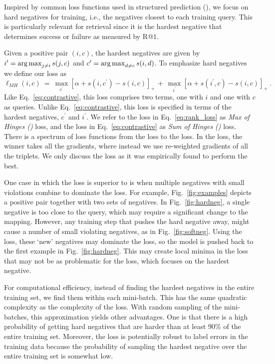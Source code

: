 Inspired by common loss functions used in structured prediction 
(\cite{tsochantaridis2005large, yu2009learning, felzenszwalb2010object}), we 
focus on hard negatives for training, i.e., the negatives closest to each 
training query.  This is particularly relevant for retrieval since it is the 
hardest negative that determines success or failure as measured by R@$1$.  




Given a positive pair $(i, c)$, the hardest negatives are given by 
$i^\prime=\operatorname*{arg\,max}_{j\neq i} s(j,c)$ and $c^\prime=\operatorname*{arg\,max}_{d\neq c} s(i,d)$.
To emphasize hard negatives we define our loss as
\begin{equation}
    \ell_{MH}(i, c)
    ~=~ \max_{c^\prime} \left[\alpha + s(i,c^\prime) - s(i,c)\right]_+
    \, +\, \max_{i^\prime} \left[\alpha + s(i^\prime,c) -s(i,c)\right]_+ ~ .
    \label{eq:rank_loss}
\end{equation}
Like Eq.~\ref{eq:contrastive}, this loss comprises two terms, 
one with $i$ and one with $c$ as queries.  Unlike Eq.~\ref{eq:contrastive}, 
this loss is specified in terms of the hardest negatives,  $c^\prime$ and 
$i^\prime$. We refer to the loss in Eq.~\ref{eq:rank_loss} 
as {\em Max of Hinges (\MAX{})}\/ loss, and the loss in 
Eq.~\ref{eq:contrastive} as {\em Sum of Hinges (\SUM{})}\/ loss. There is 
a spectrum of loss functions from the \SUM{} loss to the \MAX{} loss. In the 
\MAX{} loss, the winner takes all the gradients, where instead we use 
re-weighted gradients of all the triplets. We only discuss the \MAX{} loss as 
it was empirically found to perform the best.

One case in which the \MAX{} loss is superior to \SUM{} is when multiple 
negatives with small violations combine to dominate the \SUM{} loss.  
For example, Fig.~\ref{fig:examples} depicts a positive pair
together with two sets of negatives.  In Fig.~\ref{fig:hardneg}, a 
single negative is too close to the query, which may require
a significant change to the mapping.  
However, any training step that pushes the hard negative 
away, might cause a number of small violating negatives, as 
in Fig.~\ref{fig:softneg}. Using the \SUM{} loss, these `new' negatives 
may dominate the loss, so the model is pushed back to the first 
example in Fig.~\ref{fig:hardneg}.  This may create local minima in the 
\SUM{} loss that may not be as problematic for the \MAX{} loss, which focuses
on the hardest negative.

For computational efficiency, instead of finding the hardest negatives in the 
entire training set, we find them within each mini-batch.  
This has the same quadratic 
complexity as the complexity of the \SUM{} loss.  With random 
sampling of the mini-batches, this approximation yields other advantages.  One is 
that there is a high probability of getting hard negatives that are harder than 
at least $90\%$ of the entire training set.  Moreover, the loss is potentially 
robust to label errors in the training data because the probability of sampling 
the hardest negative over the entire training set is somewhat low.









